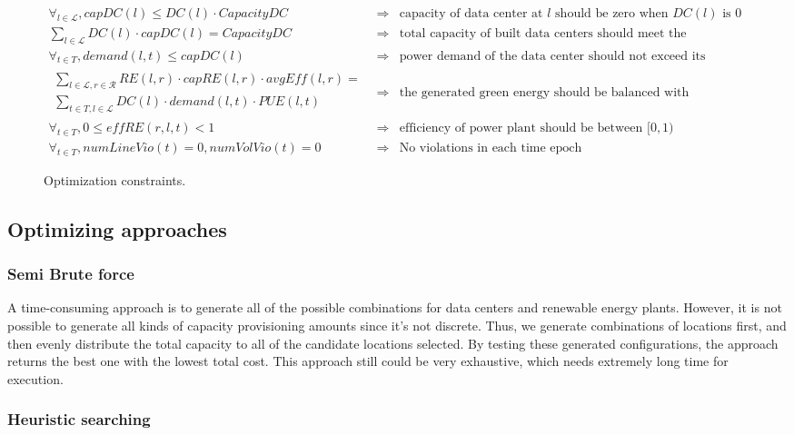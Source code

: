 \begin{figure*} [ht]
\begin{small}
\centering
\begin{eqnarray} 
\forall_{l \in \mathcal{L}}, capDC(l) \leq DC(l) \cdot CapacityDC 
&\Rightarrow& \text{capacity of data center at $l$ should be zero when $DC(l)$ is 0} \\
\sum_{l\in \mathcal{L}}{DC(l)\cdot capDC(l)} = CapacityDC  
&\Rightarrow& \text{total capacity of built data centers should meet the requirement} \\
\forall_{t \in T}, demand(l,t) \leq capDC(l) 
&\Rightarrow& \text{power demand of the data center should not exceed its capacity} \\
\begin{split}
\sum_{l \in \mathcal{L},r \in \mathcal{R}}{ RE(l,r) \cdot capRE(l,r) \cdot avg\textit{Eff}(l,r) } = \\
\sum_{t \in T, l\in \mathcal{L}}{DC(l) \cdot demand(l,t)\cdot PUE(l,t)} 
\end{split}
&\Rightarrow &\text{the generated green energy should be balanced with consumption} \\
\forall_{t \in T}, 0 \leq \textit{eff}RE(r,l,t) < 1 
&\Rightarrow&  \text{efficiency of power plant should be between $[0,1)$} \\
\forall_{t \in T}, numLineVio(t)=0, numVolVio(t)=0 
&\Rightarrow& \text{No violations in each time epoch}
\end{eqnarray}
\end{small}
\caption{Optimization constraints.}
\label{fig:constraints}
\end{figure*}

\subsection{Optimizing approaches}
\subsubsection{Semi Brute force}
A time-consuming approach is to generate all of the possible combinations for data centers and renewable energy plants. However, it is not possible to generate all kinds of capacity provisioning amounts since it's not discrete. Thus, we generate combinations of locations first, and then evenly distribute the total capacity to all of the candidate locations selected. By testing these generated configurations, the approach returns the best one with the lowest total cost. This approach still could be very exhaustive, which needs extremely long time for execution.

\subsubsection{Heuristic searching}



